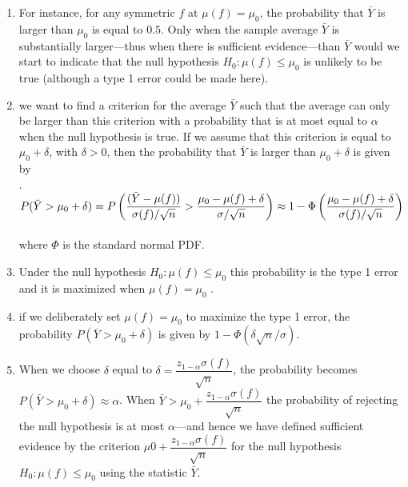 \begin{enumerate}
    \item For instance, for any symmetric $f$ at $\mu( f ) = \mu_0 $, the probability that $\bar{Y}$ is larger than $\mu_0$ is equal to $0.5$.
    Only when the sample average $\bar{Y}$ is substantially larger—thus when there is sufficient evidence—than $\bar{Y}$ would we start to indicate that the null hypothesis $H_0 : \mu( f ) \leq \mu_0$ is unlikely to be true (although a type 1 error could be made here).
    \hfill \cite{statistics/book/Statistics-for-Data-Scientists/Maurits-Kaptein}

    \item we want to find a criterion for the average $\bar{Y}$ such that the average can only be larger than this criterion with a probability that is at most equal to $\alpha$ when the null hypothesis is true. 
    If we assume that this criterion is equal to $\mu_0 + \delta$, with $\delta > 0$, then the probability that $\bar{Y}$ is larger than $\mu_0 + \delta$ is given by
    \hfill \cite{statistics/book/Statistics-for-Data-Scientists/Maurits-Kaptein}
    \\[0.3cm]
    .\hfill
    $
        P( \bar{Y} > \mu _0 + \delta)
        = P\left(\dfrac{ ( \bar{Y} - \mu ( f ))}{\sigma( f )/\sqrt{n}} > \dfrac{\mu _0 - \mu ( f ) + \delta}{\sigma/\sqrt{n}}\right)
        \approx 1 - \Phi\left(\dfrac{\mu _0 - \mu ( f ) + \delta}{\sigma( f )/\sqrt{n}}\right)
    $
    \hfill \cite{statistics/book/Statistics-for-Data-Scientists/Maurits-Kaptein}
    \\[0.3cm]
    where $\Phi$ is the standard normal PDF.
    \hfill \cite{statistics/book/Statistics-for-Data-Scientists/Maurits-Kaptein}

    \item Under the null hypothesis $H_0 : \mu( f ) \leq \mu_0$ this probability is the type 1 error and it is maximized when $\mu( f ) = \mu_0$ .
    \hfill \cite{statistics/book/Statistics-for-Data-Scientists/Maurits-Kaptein}

    \item if we deliberately set $\mu( f ) = \mu_0$ to maximize the type 1 error, the probability $P ( \bar{Y} > \mu_0 + \delta)$ is given by $1 - \Phi(\delta\sqrt{n}/\sigma)$.
    \hfill \cite{statistics/book/Statistics-for-Data-Scientists/Maurits-Kaptein}

    \item When we choose $\delta$ equal to $\delta = \dfrac{z_{1-\alpha} \sigma( f )}{\sqrt{n}}$, the probability becomes $P ( \bar{Y} > \mu_0 + \delta) \approx \alpha$. 
    When $\bar{Y} > \mu_0 + \dfrac{z_{1 - \alpha} \sigma( f )}{\sqrt{n}}$ the probability of rejecting the null hypothesis is at most $\alpha$—and hence we have defined sufficient evidence by the criterion $\mu0 + \dfrac{z_{1 - \alpha} \sigma( f )}{\sqrt{n}}$ for the null hypothesis $H_0 : \mu( f ) \leq \mu_0$ using the statistic $\bar{Y} $. 
    \hfill \cite{statistics/book/Statistics-for-Data-Scientists/Maurits-Kaptein}


\end{enumerate}
